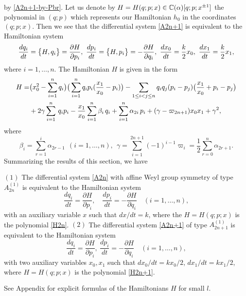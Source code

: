 by \eqref{A2n+1-by-Pbr}. 
Let us denote by $H=H(q;p;x)\in{\Bbb C}(\alpha)[q;p;x^{\pm1}]$ the polynomial in $(q;p)$ 
which represents our Hamiltonian $h_0$ in the coordinates $(q;p;x)$. 
Then we see that the differential system \eqref{A2n+1} is equivalent to the 
Hamiltonian system
\begin{equation}
\frac{dq_i}{dt}=\Pbr{H,q_i}=\frac{\partial H}{\partial p_i},\ 
\frac{dp_i}{dt}=\Pbr{H,p_i}=-\frac{\partial H}{\partial q_i},\ 
\frac{dx_0}{dt}=\frac{k}{2} x_0,\   \frac{dx_1}{dt}=\frac{k}{2} x_1,
\end{equation}
where $i=1,\ldots,n$.  
The Hamiltonian $H$ is given in the form
\begin{equation}\Label{H2n+1}
\begin{align}
H=&
\big(x_0^2-\sum_{i=1}^n q_i \big)\big(\sum_{i=1}^n q_i p_i(\frac{x_1}{x_0}-p_i)\big)
-\sum_{1\le i<j\le n}q_iq_j(p_i-p_j)\big(\frac{x_1}{x_0}+p_i-p_j\big)
\\
&
+2\gamma\sum_{i=1}^n\,q_i p_i
-\frac{x_1}{x_0}\sum_{i=1}^n\beta_i\,q_i
+\sum_{i=1}^n \alpha_{2i}\,p_i
+(\gamma-\varpi_{2n+1}) x_0x_1 
+\gamma^2,
\notag
\end{align}
\end{equation}
where
\begin{equation}
\beta_i=\sum_{r=1}^i\alpha_{2r-1}\ \ (i=1,\ldots,n),\ \ 
\gamma=\sum_{i=1}^{2n+1}(-1)^{i-1}\varpi_i
=\frac{1}{2}\sum_{r=0}^n \alpha_{2r+1}.
\end{equation}
\medskip
Summarizing the results of this section, we have 

\begin{thm} $(1)$ 
The differential system \eqref{A2n} with affine Weyl group symmetry of type $A^{(1)}_{2n}$
is equivalent to the Hamiltonian system 
\begin{equation}
\frac{dq_i}{dt}=\frac{\partial H}{\partial p_i},\quad
\frac{dp_i}{dt}=-\frac{\partial H}{\partial q_i}\quad (i=1,\ldots,n),
\end{equation}
with an auxiliary variable $x$
such that $dx/dt=k$, where the $H=H(q;p;x)$ is the polynomial \eqref{H2n}.
\newline
$(2)$
The differential system \eqref{A2n+1} of type $A^{(1)}_{2n+1}$
is equivalent to the Hamiltonian system 
\begin{equation}
\frac{dq_i}{dt}=\frac{\partial H}{\partial p_i},\ 
\frac{dp_i}{dt}=-\frac{\partial H}{\partial q_i}\quad (i=1,\ldots,n),
\end{equation}
with two auxiliary variables $x_0,x_1$ such that 
$dx_0/dt=k x_0/2$, $dx_1/dt=k x_1/2$,
where $H=H(q;p;x)$ is the polynomial 
\eqref{H2n+1}.
\end{thm}
\noindent
See Appendix for explicit formulas of the Hamiltonians $H$ for small $l$. 

